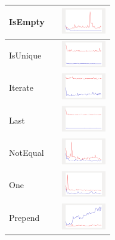 \begin{longtable}{ m{2.5cm} m{8cm} m{2cm} }
IsEmpty &

&
\includegraphics[width=2cm]{graphs/sequence/small/IsEmpty}
\\\hline

IsUnique &

&
\includegraphics[width=2cm]{graphs/sequence/small/isUnique}
\\\hline

Iterate &

&
\includegraphics[width=2cm]{graphs/sequence/small/Iterate}
\\\hline

Last &

&
\includegraphics[width=2cm]{graphs/sequence/small/Last}
\\\hline

NotEqual &

&
\includegraphics[width=2cm]{graphs/sequence/small/NEQ}
\\\hline

One &

&
\includegraphics[width=2cm]{graphs/sequence/small/One}
\\\hline

Prepend &

&
\includegraphics[width=2cm]{graphs/sequence/small/Prepend}
\\\hline


\end{longtable}
